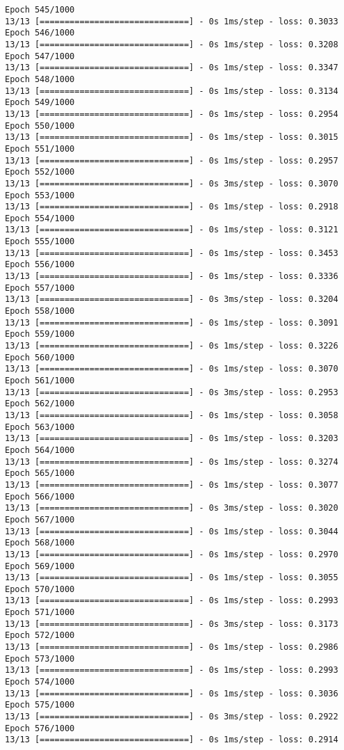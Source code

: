 \documentclass[11pt]{article}
\begin{document}
\begin{Verbatim}[commandchars=\\\{\}]
Epoch 545/1000
13/13 [==============================] - 0s 1ms/step - loss: 0.3033
Epoch 546/1000
13/13 [==============================] - 0s 1ms/step - loss: 0.3208
Epoch 547/1000
13/13 [==============================] - 0s 1ms/step - loss: 0.3347
Epoch 548/1000
13/13 [==============================] - 0s 1ms/step - loss: 0.3134
Epoch 549/1000
13/13 [==============================] - 0s 1ms/step - loss: 0.2954
Epoch 550/1000
13/13 [==============================] - 0s 1ms/step - loss: 0.3015
Epoch 551/1000
13/13 [==============================] - 0s 1ms/step - loss: 0.2957
Epoch 552/1000
13/13 [==============================] - 0s 3ms/step - loss: 0.3070
Epoch 553/1000
13/13 [==============================] - 0s 1ms/step - loss: 0.2918
Epoch 554/1000
13/13 [==============================] - 0s 1ms/step - loss: 0.3121
Epoch 555/1000
13/13 [==============================] - 0s 1ms/step - loss: 0.3453
Epoch 556/1000
13/13 [==============================] - 0s 1ms/step - loss: 0.3336
Epoch 557/1000
13/13 [==============================] - 0s 3ms/step - loss: 0.3204
Epoch 558/1000
13/13 [==============================] - 0s 1ms/step - loss: 0.3091
Epoch 559/1000
13/13 [==============================] - 0s 1ms/step - loss: 0.3226
Epoch 560/1000
13/13 [==============================] - 0s 1ms/step - loss: 0.3070
Epoch 561/1000
13/13 [==============================] - 0s 3ms/step - loss: 0.2953
Epoch 562/1000
13/13 [==============================] - 0s 1ms/step - loss: 0.3058
Epoch 563/1000
13/13 [==============================] - 0s 1ms/step - loss: 0.3203
Epoch 564/1000
13/13 [==============================] - 0s 1ms/step - loss: 0.3274
Epoch 565/1000
13/13 [==============================] - 0s 1ms/step - loss: 0.3077
Epoch 566/1000
13/13 [==============================] - 0s 3ms/step - loss: 0.3020
Epoch 567/1000
13/13 [==============================] - 0s 1ms/step - loss: 0.3044
Epoch 568/1000
13/13 [==============================] - 0s 1ms/step - loss: 0.2970
Epoch 569/1000
13/13 [==============================] - 0s 1ms/step - loss: 0.3055
Epoch 570/1000
13/13 [==============================] - 0s 1ms/step - loss: 0.2993
Epoch 571/1000
13/13 [==============================] - 0s 3ms/step - loss: 0.3173
Epoch 572/1000
13/13 [==============================] - 0s 1ms/step - loss: 0.2986
Epoch 573/1000
13/13 [==============================] - 0s 1ms/step - loss: 0.2993
Epoch 574/1000
13/13 [==============================] - 0s 1ms/step - loss: 0.3036
Epoch 575/1000
13/13 [==============================] - 0s 3ms/step - loss: 0.2922
Epoch 576/1000
13/13 [==============================] - 0s 1ms/step - loss: 0.2914

\end{Verbatim}
\end{document}
